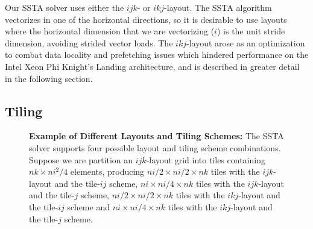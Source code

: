 \documentclass{sig-alternate-05-2015}
\begin{document}
Our SSTA solver uses either the \(ijk\)- or \(ikj\)-layout.
The SSTA algorithm vectorizes in one of the horizontal directions, so it is
  desirable to use layouts where the horizontal dimension that we are
  vectorizing (\(i\)) is the unit stride dimension, avoiding strided vector loads.
The \(ikj\)-layout arose as an optimization to combat data locality and
  prefetching issues which hindered performance on the Intel Xeon Phi Knight's
  Landing architecture, and is described in greater detail in the following
  section.

\subsection{Tiling}
\label{sec:implementation:tiling}

\begin{figure}[!bth]
  \centering
  \caption{
    \textbf{Example of Different Layouts and Tiling Schemes:}
      The SSTA solver supports four possible layout and tiling scheme combinations.
      Suppose we are partition an \(ijk\)-layout grid into tiles containing
        \(nk \times ni^2/4\) elements, producing 
        \(ni/2 \times ni/2 \times nk\) tiles with the \(ijk\)-layout and the
          tile-\(ij\) scheme,
        \(ni \times ni/4 \times nk\) tiles with the \(ijk\)-layout and the
          tile-\(j\) scheme,
        \(ni/2 \times ni/2 \times nk\) tiles with the \(ikj\)-layout and the
          tile-\(ij\) scheme and
        \(ni \times ni/4 \times nk\) tiles with the \(ikj\)-layout and the
          tile-\(j\) scheme.
  }
  \label{fig:results:layout_tiling_example}
  \vspace{1em}
  \begin{minipage}{0.49\textwidth}
    \centering
\end{minipage}
\end{figure}
\end{document}
